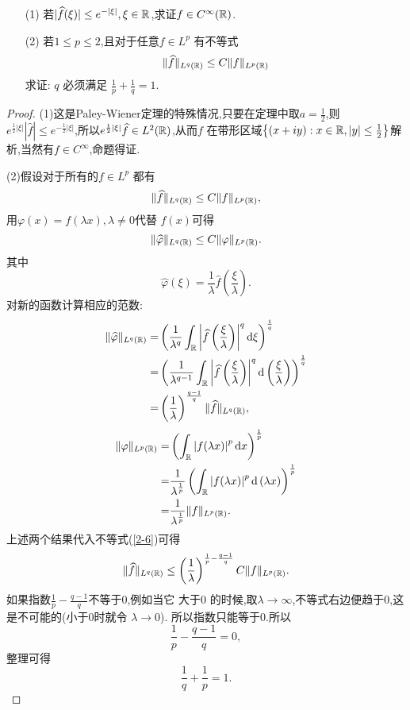 \begin{exercise}
  \begin{enumerate}
    \item []
    \item [(1)]若$| \widehat{f}(\xi)| \le e^{-|\xi|},\xi \in \mathbb{R} $,求证$f\in C^{\infty}(\mathbb{R})$.
    \item [(2)]若$1\le p\le 2$,且对于任意$f\in L^{p}$ 有不等式
      \[
	\|\widehat{f}\|_{L^{q}(\mathbb{R})}\le C\|f\|_{L^{p}(\mathbb{R})}
      \] 
      求证: $q$ 必须满足 $\frac{1}{p}+\frac{1}{q}=1$.
  \end{enumerate}
\end{exercise}
\begin{proof}(1)这是Paley-Wiener定理的特殊情况,只要在定理中取$a=\frac{1}{2}$,则 $e^{\frac{1}{2}|\xi|}|\widehat{f}|\le e^{-\frac{1}{2}|\xi|}$,所以$e^{\frac{1}{2}|\xi|}\widehat{f}\in L^{2}(\mathbb{R})$,从而$f$ 在带形区域$\left\{(x+iy):x\in \mathbb{R},|y|\le \frac{1}{2}\right\} $解析,当然有$f\in C^{\infty}$,命题得证.
 
  (2)假设对于所有的$f\in L^{p}$ 都有
  \begin{equation}\label{2-5}
   \|\widehat{f}\|_{L^{q}(\mathbb{R})}\le C \|f\|_{L^{p}(\mathbb{R})},
 \end{equation}
 用$\varphi(x)=f(\lambda x),\lambda\neq 0$代替 $f(x)$可得
 \begin{equation}\label{2-6}
    \|\widehat{\varphi}\|_{L^{q}(\mathbb{R})}\le C\|\varphi\|_{L^{p}(\mathbb{R})}.
 \end{equation}
 其中 
\[
  \widehat{\varphi}(\xi)=\frac{1}{\lambda}\widehat{f}\left( \frac{\xi}{\lambda} \right) .
\] 
对新的函数计算相应的范数:
\begin{align*}
  \|\widehat{\varphi}\|_{L^{q}(\mathbb{R})} =& \left( \frac{1}{\lambda^{q}} \int_{\mathbb{R}}\left|\widehat{f}\left( \frac{\xi}{\lambda} \right)  \right|^{q}\mathrm{d}\xi \right)^{\frac{1}{q}}\\
  = & \left( \frac{1}{\lambda^{q-1}}\int_{\mathbb{R}}\left| \widehat{f}\left( \frac{\xi}{\lambda} \right)  \right| ^{q}\mathrm{d}\left( \frac{\xi}{\lambda} \right)  \right) ^{\frac{1}{q}}\\
  = & \left( \frac{1}{\lambda} \right) ^{\frac{q-1}{q}} \|\widehat{f}\|_{L^{q}(\mathbb{R})}
,\end{align*}
\begin{align*}
  \|\varphi\|_{L^{p}(\mathbb{R})} = & \left( \int_{\mathbb{R}}\left| f(\lambda x) \right| ^{p}\mathrm{d}x \right) ^{\frac{1}{p}}\\
  = &\frac{1}{\lambda^{\frac{1}{p}}} \left( \int_{\mathbb{R}}\left| f(\lambda x) \right| ^{p}\mathrm{d}\left( \lambda x \right)  \right)^{\frac{1}{p}}\\
  = & \frac{1}{\lambda^{\frac{1}{p}}} \|f\|_{L^{p}(\mathbb{R})}
.\end{align*}
上述两个结果代入不等式(\ref{2-6})可得
\[
  \|\widehat{f}\|_{L^{q}(\mathbb{R})}\le \left( \frac{1}{\lambda} \right) ^{\frac{1}{p}-\frac{q-1}{q}} C\|f\|_{L^{p}(\mathbb{R})}.
\] 
如果指数$\frac{1}{p}-\frac{q-1}{q}$不等于$0$,例如当它 大于$0$ 的时候,取$\lambda\to \infty$,不等式右边便趋于$0$,这是不可能的(小于$0$时就令 $\lambda\to 0$). 所以指数只能等于$0$.所以
 \[
\frac{1}{p}-\frac{q-1}{q}=0,
\] 
整理可得
\[
\frac{1}{q}+\frac{1}{p}=1.
\]
\end{proof}

